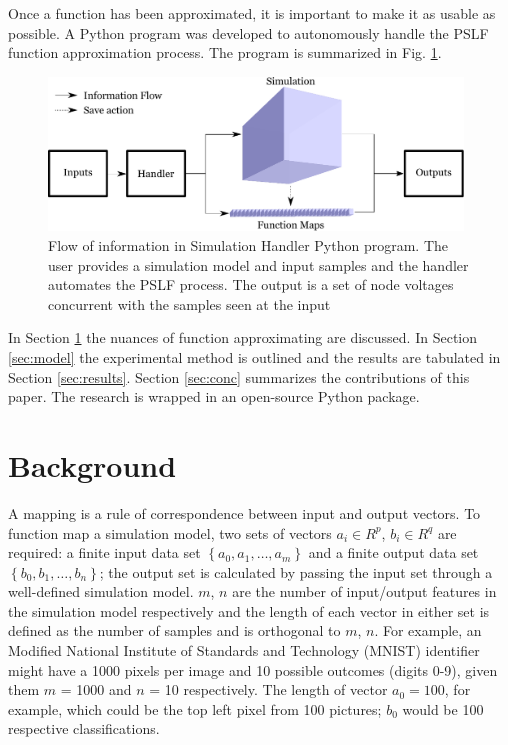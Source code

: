 \documentclass[conference]{IEEEtran}
\begin{document}
Once a function has been approximated, it is important to make it as usable as possible. A Python program was developed to autonomously handle the PSLF function approximation process. The program is summarized in Fig. \ref{fig:infoflow}.

\begin{figure}[h]
	\centering
	\includegraphics[width=11cm]{informationflow.pdf}
	\caption{Flow of information in Simulation Handler Python program. The user provides a simulation model and input samples and the handler automates the PSLF process. The output is a set of node voltages concurrent with the samples seen at the input	}
	\label{fig:infoflow}
\end{figure}

In Section \ref{sec:relwork} the nuances of function approximating are discussed. In Section \ref{sec:model} the experimental method is outlined and the results are tabulated in Section \ref{sec:results}. Section \ref{sec:conc} summarizes the contributions of this paper. The research is wrapped in an open-source Python package.

\section{Background}
\label{sec:relwork}
A mapping is a rule of correspondence between input and output vectors. To function map a simulation model, two sets of vectors $a_{i} \in R^{p}$, $b_{i} \in R^{q}$ are required: a finite input data set $\left\{a_{0}, a_{1}, \ldots, a_{m}\right\}$ and a finite output data set $\left\{b_{0}, b_{1}, \ldots, b_{n}\right\}$; the output set is calculated by passing the input set through a well-defined simulation model. $m$, $n$ are the number of input/output features in the simulation model respectively and the length of each vector in either set is defined as the number of samples and is orthogonal to $m$, $n$. For example, an Modified National Institute of Standards and Technology (MNIST) identifier might have a 1000 pixels per image and 10 possible outcomes (digits 0-9), given them $m$ = 1000 and $n$ = 10 respectively. The length of vector $a_0 = 100$, for example, which could be the top left pixel from 100 pictures; $b_0$ would be 100 respective classifications.
\end{document}

